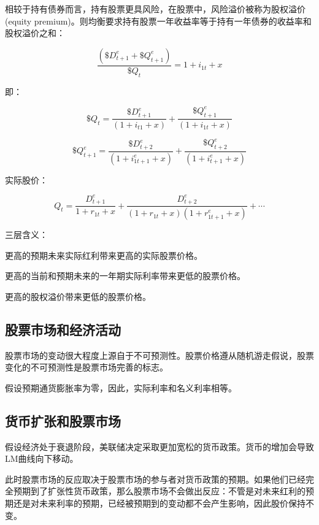 \documentclass{article}
\begin{document}
相较于持有债券而言，持有股票更具风险，在股票中，风险溢价被称为股权溢价(equity premium)。则均衡要求持有股票一年收益率等于持有一年债券的收益率和股权溢价之和：

\[
\frac{(\$D^e_{t+1}+\$Q^e_{t+1})}{\$Q_t}=1+i_{1t}+x
\]

即：

\[
\$Q_t=\frac{\$D^e_{t+1}}{(1+i_{t1}+x)}+\frac{\$Q^e_{t+1}}{(1+i_{1t}+x)}
\]

\[
\$Q^e_{t+1}=\frac{\$D^e_{t+2}}{(1+i^e_{1t+1}+x)}+\frac{\$Q^e_{t+2}}{(1+i^e_{t+1}+x)}
\]

实际股价：

\[
Q_t=\frac{D^e_{t+1}}{1+r_{1t}+x}+\frac{D^e_{t+2}}{(1+r_{1t}+x)(1+r^e_{1t+1}+x)}+\cdots
\]

三层含义：

更高的预期未来实际红利带来更高的实际股票价格。

更高的当前和预期未来的一年期实际利率带来更低的股票价格。

更高的股权溢价带来更低的股票价格。

\subsection{股票市场和经济活动}

股票市场的变动很大程度上源自于不可预测性。股票价格遵从随机游走假说，股票变化的不可预测性是股票市场完善的标志。

假设预期通货膨胀率为零，因此，实际利率和名义利率相等。

\subsection{货币扩张和股票市场}

假设经济处于衰退阶段，美联储决定采取更加宽松的货币政策。货币的增加会导致LM曲线向下移动。

此时股票市场的反应取决于股票市场的参与者对货币政策的预期。如果他们已经完全预期到了扩张性货币政策，那么股票市场不会做出反应：不管是对未来红利的预期还是对未来利率的预期，已经被预期到的变动都不会产生影响，因此股价保持不变。
\end{document}
